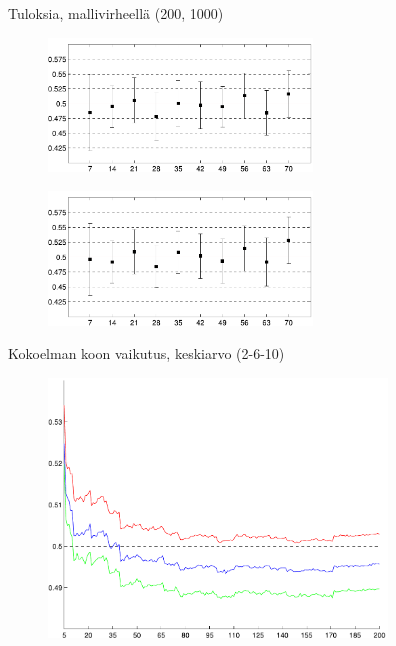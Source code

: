 \documentclass{beamer}
\begin{document}
\begin{frame}{Tuloksia, mallivirheellä (200, 1000)}

\begin{figure}
\includegraphics[width=7cm]{xxx_200_model_error.pdf}
\end{figure}

\begin{figure}
\includegraphics[width=7cm]{xxx_1000_model_error.pdf}
\end{figure}

\end{frame}

\begin{frame}{Kokoelman koon vaikutus, keskiarvo (2-6-10)}

\begin{figure}
\includegraphics[width=9cm]{mean_conv_2_6_10.pdf}
\end{figure}

\end{frame}
\end{document}
